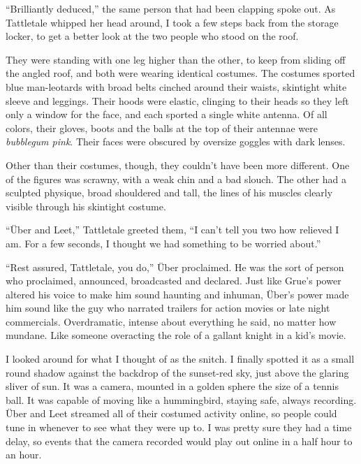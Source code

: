 ``Brilliantly deduced,'' the same person that had been clapping spoke out.  As Tattletale whipped her head around, I took a few steps back from the storage locker, to get a better look at the two people who stood on the roof.



They were standing with one leg higher than the other, to keep from sliding off the angled roof, and both were wearing identical costumes.  The costumes sported blue man-leotards with broad belts cinched around their waists, skintight white sleeve and leggings.  Their hoods were elastic, clinging to their heads so they left only a window for the face, and each sported a single white antenna.  Of all colors, their gloves, boots and the balls at the top of their antennae were \emph{bubblegum pink}.  Their faces were obscured by oversize goggles with dark lenses.



Other than their costumes, though, they couldn't have been more different.  One of the figures was scrawny, with a weak chin and a bad slouch.  The other had a sculpted physique, broad shouldered and tall, the lines of his muscles clearly visible through his skintight costume.



``\"{U}ber and Leet,'' Tattletale greeted them, ``I can't tell you two how relieved I am.  For a few seconds, I thought we had something to be worried about.''



``Rest assured, Tattletale, you do,'' \"{U}ber proclaimed.  He was the sort of person who proclaimed, announced, broadcasted and declared.  Just like Grue's power altered his voice to make him sound haunting and inhuman, \"{U}ber's power made him sound like the guy who narrated trailers for action movies or late night commercials.  Overdramatic, intense about everything he said, no matter how mundane.  Like someone overacting the role of a gallant knight in a kid's movie.



I looked around for what I thought of as the snitch.  I finally spotted it as a small round shadow against the backdrop of the sunset-red sky, just above the glaring sliver of sun.  It was a camera, mounted in a golden sphere the size of a tennis ball.  It was capable of moving like a hummingbird, staying safe, always recording.  \"{U}ber and Leet streamed all of their costumed activity online, so people could tune in whenever to see what they were up to. I was pretty sure they had a time delay, so events that the camera recorded would play out online in a half hour to an hour.



